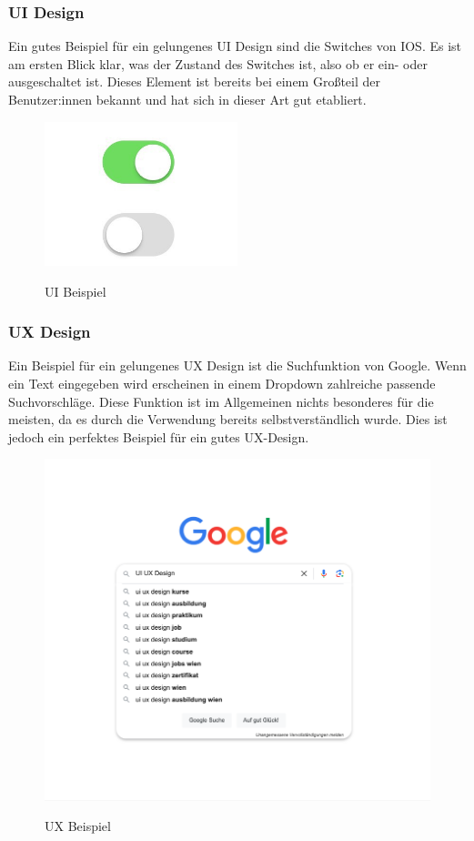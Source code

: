 \subsubsection{UI Design}
Ein gutes Beispiel für ein gelungenes UI Design sind die Switches von IOS. Es ist am ersten Blick klar, was der Zustand des Switches ist, also ob er ein- oder ausgeschaltet ist. Dieses Element ist bereits bei einem Großteil der Benutzer:innen bekannt und hat sich in dieser Art gut etabliert.

\begin{figure}[h!]
    \centering
    \includegraphics[width=0.5\textwidth]{pics/ui-example.png}
    \caption{UI Beispiel}
    \cite{frontend_ui_ux}
    \label{fig:mesh1}
\end{figure}
\newpage
\subsubsection{UX Design}
Ein Beispiel für ein gelungenes UX Design ist die Suchfunktion von Google. Wenn ein Text eingegeben wird erscheinen in einem Dropdown zahlreiche passende Suchvorschläge. Diese Funktion ist im Allgemeinen nichts besonderes für die meisten, da es durch die Verwendung bereits selbstverständlich wurde. Dies ist jedoch ein perfektes Beispiel für ein gutes UX-Design.

\begin{figure}[h!]
    \centering
    \includegraphics[width=1\textwidth]{pics/ux-example.png}
    \caption{UX Beispiel}
    \cite{frontend_ui_ux}
    \label{fig:mesh1}
\end{figure}

\cite{frontend_ui_ux}